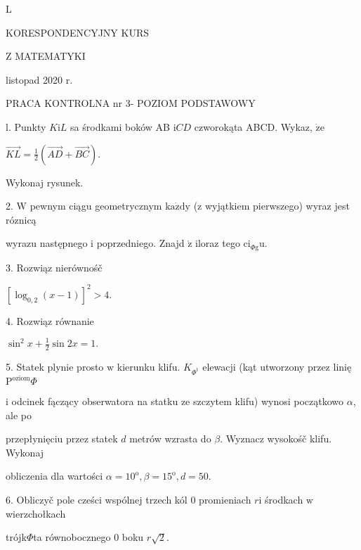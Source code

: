 \documentclass[a4paper,12pt]{article}
\begin{document}
L

KORESPONDENCYJNY KURS

Z MATEMATYKI

listopad 2020 r.

PRACA KONTROLNA nr 3- POZIOM PODSTAWOWY

l. Punkty $K\mathrm{i}L$ sa środkami boków AB $\mathrm{i}CD$ czworokąta ABCD. Wykaz, $\dot{\mathrm{z}}\mathrm{e}$

$\displaystyle \vec{KL}=\frac{1}{2}(\vec{AD}+\vec{BC}).$

Wykonaj rysunek.

2. $\mathrm{W}$ pewnym ciągu geometrycznym $\mathrm{k}\mathrm{a}\dot{\mathrm{z}}\mathrm{d}\mathrm{y}$ ($\mathrm{z}$ wyjątkiem pierwszego) wyraz jest róznicą

wyrazu następnego $\mathrm{i}$ poprzedniego. Znajd $\acute{\mathrm{z}}$ iloraz tego $\mathrm{c}\mathrm{i}_{\Phi \mathrm{g}}\mathrm{u}.$

3. Rozwiąz nierównośč

$[\log_{0,2}(x-1)]^{2}>4.$

4. Rozwiąz równanie

$\displaystyle \sin^{2}x+\frac{1}{2}\sin 2x=1.$

5. Statek plynie prosto $\mathrm{w}$ kierunku klifu. $K_{\Phi^{\mathrm{t}}}$ elewacji (kąt utworzony przez linię $\mathrm{P}^{\mathrm{o}\mathrm{z}\mathrm{i}\mathrm{o}\mathrm{m}}\Phi$

$\mathrm{i}$ odcinek fączący obserwatora na statku ze szczytem klifu) wynosi początkowo $\alpha$, ale po

przepłynięciu przez statek $d$ metrów wzrasta do $\beta$. Wyznacz wysokośč klifu. Wykonaj

obliczenia dla wartości $\alpha=10^{\mathrm{o}}, \beta=15^{\mathrm{o}}, d=50.$

6. Obliczyč pole cześci wspólnej trzech kól $0$ promieniach $r \mathrm{i}$ środkach $\mathrm{w}$ wierzchołkach

trójk$\Phi$ta równobocznego $0$ boku $r\sqrt{2}.$
\end{document}
